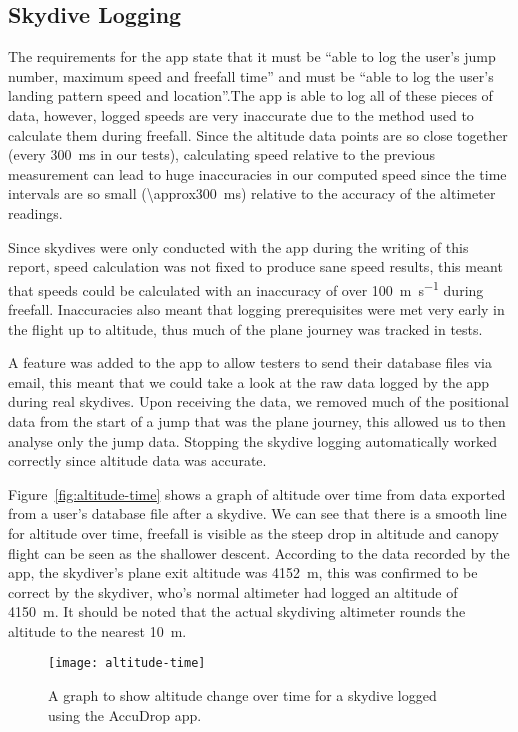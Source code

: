 \subsection{Skydive Logging}\label{subsec:skydive-logging}
The requirements for the app state that it must be ``able to log the user's jump number, maximum speed and freefall time'' and must be ``able to log the user's landing pattern speed and location''.The app is able to log all of these pieces of data, however, logged speeds are very inaccurate due to the method used to calculate them during freefall. Since the altitude data points are so close together (every \SI{300}{\milli\second} in our tests), calculating speed relative to the previous measurement can lead to huge inaccuracies in our computed speed since the time intervals are so small (\SI{\approx300}{\milli\second}) relative to the accuracy of the altimeter readings.

Since skydives were only conducted with the app during the writing of this report, speed calculation was not fixed to produce sane speed results, this meant that speeds could be calculated with an inaccuracy of over \SI{100}{\metre\per\second} during freefall. Inaccuracies also meant that logging prerequisites were met very early in the flight up to altitude, thus much of the plane journey was tracked in tests.

A feature was added to the app to allow testers to send their database files via email, this meant that we could take a look at the raw data logged by the app during real skydives. Upon receiving the data, we removed much of the positional data from the start of a jump that was the plane journey, this allowed us to then analyse only the jump data. Stopping the skydive logging automatically worked correctly since altitude data was accurate.

Figure~\vref{fig:altitude-time} shows a graph of altitude over time from data exported from a user's database file after a skydive. We can see that there is a smooth line for altitude over time, freefall is visible as the steep drop in altitude and canopy flight can be seen as the shallower descent. According to the data recorded by the app, the skydiver's plane exit altitude was \SI{4152}{\metre}, this was confirmed to be correct by the skydiver, who's normal altimeter had logged an altitude of \SI{4150}{\metre}. It should be noted that the actual skydiving altimeter rounds the altitude to the nearest \SI{10}{\metre}.

\begin{figure}[ht]
  \centering
  \texttt{[image: altitude-time]}
  \caption{A graph to show altitude change over time for a skydive logged using the AccuDrop app.}\label{fig:altitude-time}
\end{figure}


